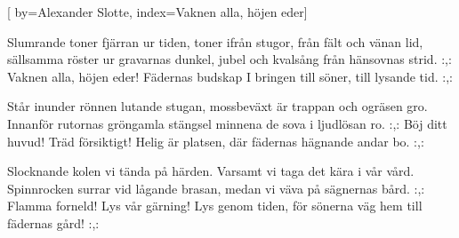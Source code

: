 

[
by={Alexander Slotte},
index={Vaknen alla, höjen eder}]

\beginverse* 
Slumrande toner fjärran ur tiden,
toner ifrån stugor, från fält och vänan lid,
sällsamma röster ur gravarnas dunkel,
jubel och kvalsång från hänsovnas strid.
:,: Vaknen alla, höjen eder! Fädernas budskap
I bringen till söner, till lysande tid. :,:
\endverse

\beginverse* 
Står inunder rönnen lutande stugan,
mossbeväxt är trappan och ogräsen gro. 
Innanför rutornas gröngamla stängsel 
minnena de sova i ljudlösan ro.
:,: Böj ditt huvud! Träd försiktigt! Helig är platsen,
där fädernas hägnande andar bo. :,:
\endverse

\beginverse* 
Slocknande kolen vi tända på härden.
Varsamt vi taga det kära i vår vård. 
Spinnrocken surrar vid lågande brasan,
medan vi väva på sägnernas bård.
:,: Flamma forneld! Lys vår gärning! Lys genom tiden,
för sönerna väg hem till fädernas gård! :,:
\endverse
\endsong


